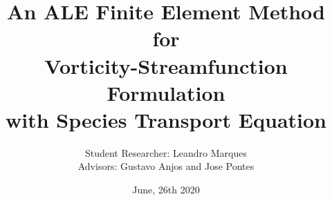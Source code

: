

\usepackage[T1]{fontenc} %
\usepackage[utf8]{inputenc} %
\usepackage[portuguese]{babel} %
\usepackage{cite} %
\usepackage{epsf,epsfig,psfig} %
\usepackage{fancyhdr} %
\usepackage{setspace} %
\usepackage{float} %
\usepackage{makeidx} %
\usepackage{amsmath,amssymb,bm,amsbsy} %
\usepackage{mathtools} %
\usepackage{lipsum} %
\usepackage{tikz,tikz-3dplot,pgfplots}
\usetikzlibrary{patterns}
\usepackage{relsize}
\usetikzlibrary{shapes,arrows,arrows.meta,matrix}
\usepackage{ragged2e}

\justifying \title[]{An ALE Finite Element Method for \\ Vorticity-Streamfunction Formulation \\ with Species Transport Equation}
\subtitle{}
\author{\vspace{0.5cm} Student Researcher: Leandro Marques \\ Advisors: Gustavo Anjos and Jose Pontes}

\date{June, 26th 2020}


\beamertemplatenavigationsymbolsempty 


